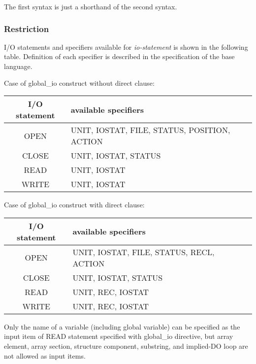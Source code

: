   The first syntax is just a shorthand of the second syntax.

   \subsubsection*{Restriction}

   I/O statements and specifiers available for {\it io-statement} is
   shown in the following table.
   Definition of each specifier is described in the specification of the base language. 

   Case of global\_io construct without direct clause:
   \begin{table}[h]
   \begin{center}
    \label{tb:globalstatement}
    \begin{tabular}{c|l}
     I/O statement & available specifiers \\ \hline
     OPEN & UNIT, IOSTAT, FILE, STATUS, POSITION, ACTION \\
     CLOSE & UNIT, IOSTAT, STATUS \\
     READ & UNIT, IOSTAT \\
     WRITE & UNIT, IOSTAT \\
    \end{tabular}
   \end{center}
   \end{table}

   Case of global\_io construct with direct clause:
   \begin{table}[h]
   \begin{center}
    \label{tb:globalstatement}
    \begin{tabular}{c|l}
     I/O statement & available specifiers \\ \hline
     OPEN & UNIT, IOSTAT, FILE, STATUS, RECL, ACTION \\
     CLOSE & UNIT, IOSTAT, STATUS \\
     READ & UNIT, REC, IOSTAT \\
     WRITE & UNIT, REC, IOSTAT \\
    \end{tabular}
   \end{center}
   \end{table}

   Only the name of a variable (including global variable) can be specified 
   as the input item of READ statement specified with global\_io directive,
   but array element, array section,
   structure component, substring, and implied-DO loop are not allowed as input items.


